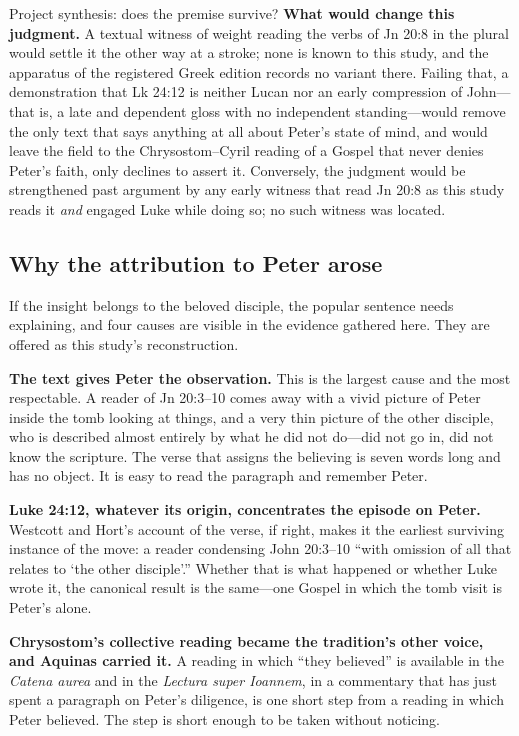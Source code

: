 \begin{studybox}{Project synthesis: does the premise survive?}
\textbf{What would change this judgment.} A textual witness of weight reading
the verbs of Jn 20:8 in the plural would settle it the other way at a stroke;
none is known to this study, and the apparatus of the registered Greek edition
records no variant there. Failing that, a demonstration that Lk 24:12 is
neither Lucan nor an early compression of John---that is, a late and dependent
gloss with no independent standing---would remove the only text that says
anything at all about Peter's state of mind, and would leave the field to the
Chrysostom--Cyril reading of a Gospel that never denies Peter's faith, only
declines to assert it. Conversely, the judgment would be strengthened past
argument by any early witness that read Jn 20:8 as this study reads it
\emph{and} engaged Luke while doing so; no such witness was located.
\end{studybox}

\subsection{Why the attribution to Peter arose}

If the insight belongs to the beloved disciple, the popular sentence needs
explaining, and four causes are visible in the evidence gathered here. They are
offered as this study's reconstruction.

\textbf{The text gives Peter the observation.} This is the largest cause and the
most respectable. A reader of Jn 20:3--10 comes away with a vivid picture of
Peter inside the tomb looking at things, and a very thin picture of the other
disciple, who is described almost entirely by what he did not do---did not go
in, did not know the scripture. The verse that assigns the believing is seven
words long and has no object. It is easy to read the paragraph and remember
Peter.

\textbf{Luke 24:12, whatever its origin, concentrates the episode on Peter.}
Westcott and Hort's account of the verse, if right, makes it the earliest
surviving instance of the move: a reader condensing John 20:3--10 ``with
omission of all that relates to `the other disciple'.'' Whether that is what
happened or whether Luke wrote it, the canonical result is the same---one Gospel
in which the tomb visit is Peter's alone.

\textbf{Chrysostom's collective reading became the tradition's other voice, and
Aquinas carried it.} A reading in which ``they believed'' is available in the
\emph{Catena aurea} and in the \emph{Lectura super Ioannem}, in a commentary
that has just spent a paragraph on Peter's diligence, is one short step from a
reading in which Peter believed. The step is short enough to be taken without
noticing.

